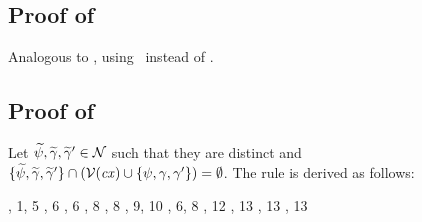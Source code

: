 \subsection*{Proof of }

Analogous to , using \Reexop\ instead of \Refaop.



\subsection*{Proof of }

Let $\widetilde{\psi},\widetilde{\gamma},\widetilde{\gamma}'\in\mathcal{N}$ such that they are distinct and
$\{\widetilde{\psi},\widetilde{\gamma},\widetilde{\gamma}'\}\cap
(\mathcal{V}(\mathit{cx})\cup\{\psi,\gamma,\gamma'\})=\emptyset$. The rule is
derived as follows:
\begin{derivation}
\step{\istyO{\typ}}{\hyp}
\step{\isty{\cx,\vdec{\varFXpred}{\tarr{\typ}{\bool}}}{\typ}}
     {, 1, 5}
\step{\hasty{\cx,\vdec{\varFXpred}{\tarr{\typ}{\bool}}}
            {\exopO}{\tarr{(\tarr{\typ}{\bool})}{\bool}}}
     {\Reexop, 6}
\step{\cxwf{\cx,\vdec{\varFXpred}{\tarr{\typ}{\bool}},\vdec{\varFX}{\typ}}}
     {\RcxvdecI, 6}
\step{\hasty{\cx,\vdec{\varFXpred}{\tarr{\typ}{\bool}},\vdec{\varFX}{\typ}}
            {\varFXpred}{\tarr{\typ}{\bool}}}
     {\Revar, 8}
\step{\hasty{\cx,\vdec{\varFXpred}{\tarr{\typ}{\bool}},\vdec{\varFX}{\typ}}
            {\varFX}{\typ}}
     {\Revar, 8}
\step{\hasty{\cx,\vdec{\varFXpred}{\tarr{\typ}{\bool}},\vdec{\varFX}{\typ}}
            {\app{\varFXpred}{\varFX}}{\bool}}
     {\Reapp, 9, 10}
\step{\isty{\cx,\vdec{\varFXpred}{\tarr{\typ}{\bool}},\vdec{\varFX}{\typ}}
           {\typ}}
     {, 6, 8}
     {\RcxvdecI, 12}
     {\Revar, 13}
     {\Revar, 13}
     {\Revar, 13}

\end{derivation}
